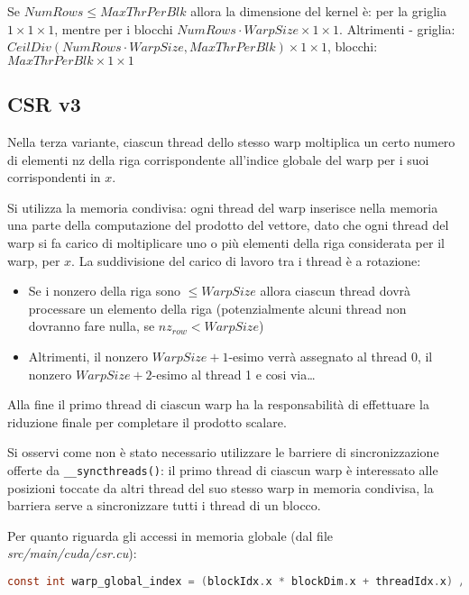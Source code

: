 \documentclass[a4paper,9pt]{extarticle}
\begin{document}
Se $NumRows \le MaxThrPerBlk$ allora la dimensione del kernel è: per la griglia $1 \times 1 \times 1$, mentre per i
blocchi $NumRows \cdot WarpSize \times 1 \times 1$. Altrimenti - griglia: $CeilDiv(NumRows \cdot WarpSize, MaxThrPerBlk) \times 1 \times 1$, blocchi: $MaxThrPerBlk \times 1 \times 1$

\subsection{CSR v3}
Nella terza variante, ciascun thread dello stesso warp moltiplica un certo numero di elementi nz della riga corrispondente
all'indice globale del warp per i suoi corrispondenti in $x$.

Si utilizza la memoria condivisa: ogni thread del warp inserisce nella memoria una parte della computazione del prodotto
del vettore, dato che ogni thread del warp si fa carico di moltiplicare uno o più elementi della riga considerata 
per il warp, per $x$. La suddivisione del carico di lavoro tra i thread è a rotazione:
\begin{itemize}
	\item Se i nonzero della riga sono $\le WarpSize$ allora ciascun thread dovrà processare un elemento della riga
	(potenzialmente alcuni thread non dovranno fare nulla, se $nz_{row} < WarpSize$)
	
	\item Altrimenti, il nonzero $WarpSize + 1$-esimo verrà assegnato al thread 0, il nonzero $WarpSize + 2$-esimo 
	al thread 1 e cosi via\dots
\end{itemize}

Alla fine il primo thread di ciascun warp ha la responsabilità di effettuare la riduzione finale per completare il 
prodotto scalare.

Si osservi come non è stato necessario utilizzare le barriere di sincronizzazione offerte da \texttt{\_\_syncthreads()}:
il primo thread di ciascun warp è interessato alle posizioni toccate da altri thread del suo stesso warp
in memoria condivisa, la barriera serve a sincronizzare tutti i thread di un blocco.

Per quanto riguarda gli accessi in memoria globale (dal file \textit{src/main/cuda/csr.cu}):
\vspace{\baselineskip}

\begin{lstlisting}[language=C]
const int warp_global_index = (blockIdx.x * blockDim.x + threadIdx.x) / warpSize;
\end{lstlisting}
\end{document}
